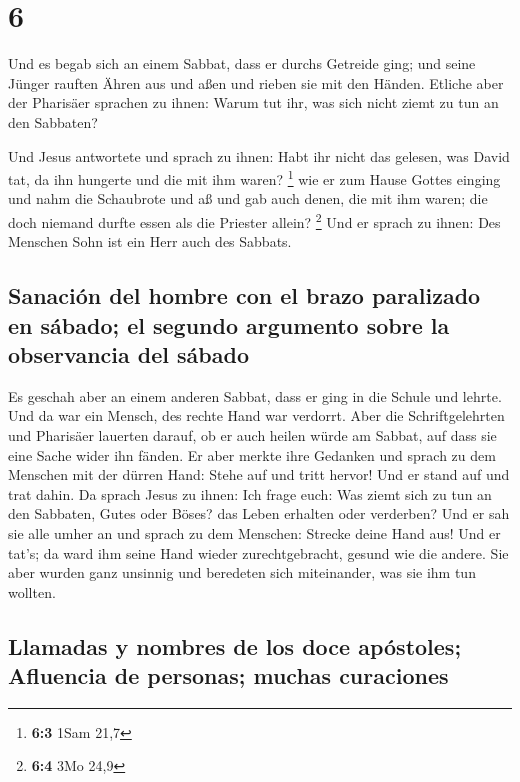 \hypertarget{section-5}{%
\section{6}\label{section-5}}

 Und es begab sich an einem Sabbat, dass er durchs
Getreide ging; und seine Jünger rauften Ähren aus und aßen und rieben
sie mit den Händen.  Etliche aber der Pharisäer sprachen
zu ihnen: Warum tut ihr, was sich nicht ziemt zu tun an den Sabbaten?

 Und Jesus antwortete und sprach zu ihnen: Habt ihr nicht
das gelesen, was David tat, da ihn hungerte und die mit ihm waren?
\footnote{\textbf{6:3} 1Sam 21,7}  wie er zum Hause Gottes
einging und nahm die Schaubrote und aß und gab auch denen, die mit ihm
waren; die doch niemand durfte essen als die Priester allein?
\footnote{\textbf{6:4} 3Mo 24,9}  Und er sprach zu ihnen:
Des Menschen Sohn ist ein Herr auch des Sabbats.

\hypertarget{sanaciuxf3n-del-hombre-con-el-brazo-paralizado-en-suxe1bado-el-segundo-argumento-sobre-la-observancia-del-suxe1bado}{%
\subsection{Sanación del hombre con el brazo paralizado en sábado; el
segundo argumento sobre la observancia del
sábado}\label{sanaciuxf3n-del-hombre-con-el-brazo-paralizado-en-suxe1bado-el-segundo-argumento-sobre-la-observancia-del-suxe1bado}}

 Es geschah aber an einem anderen Sabbat, dass er ging in
die Schule und lehrte. Und da war ein Mensch, des rechte Hand war
verdorrt.  Aber die Schriftgelehrten und Pharisäer
lauerten darauf, ob er auch heilen würde am Sabbat, auf dass sie eine
Sache wider ihn fänden.  Er aber merkte ihre Gedanken und
sprach zu dem Menschen mit der dürren Hand: Stehe auf und tritt hervor!
Und er stand auf und trat dahin.  Da sprach Jesus zu
ihnen: Ich frage euch: Was ziemt sich zu tun an den Sabbaten, Gutes oder
Böses? das Leben erhalten oder verderben?  Und er sah sie
alle umher an und sprach zu dem Menschen: Strecke deine Hand aus! Und er
tat's; da ward ihm seine Hand wieder zurechtgebracht, gesund wie die
andere.  Sie aber wurden ganz unsinnig und beredeten sich
miteinander, was sie ihm tun wollten.

\hypertarget{llamadas-y-nombres-de-los-doce-apuxf3stoles-afluencia-de-personas-muchas-curaciones}{%
\subsection{Llamadas y nombres de los doce apóstoles; Afluencia de
personas; muchas
curaciones}\label{llamadas-y-nombres-de-los-doce-apuxf3stoles-afluencia-de-personas-muchas-curaciones}}

